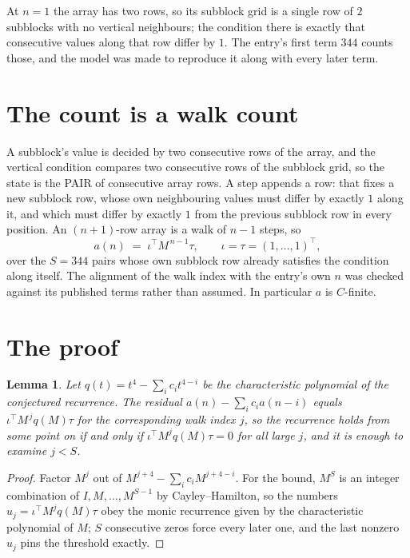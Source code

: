 \documentclass[11pt,a4paper]{article}
\theoremstyle{plain}
\newtheorem{lemma}[theorem]{Lemma}
\theoremstyle{definition}
\begin{document}
At $n=1$ the array has two rows, so its subblock grid is a single row of $2$ subblocks with
no vertical neighbours; the condition there is exactly that consecutive values along that row
differ by $1$. The entry's first term $344$ counts those, and the model was made to
reproduce it along with every later term.

\section{The count is a walk count}

A subblock's value is decided by two consecutive rows of the array, and the
vertical condition compares two consecutive rows of the subblock grid, so the state is the
PAIR of consecutive array rows. A step appends a row: that fixes a new subblock row, whose own
neighbouring values must differ by exactly $1$ along it, and which must differ by exactly
$1$ from the previous subblock row in every position. An $(n+1)$-row array is a walk of
$n-1$ steps, so
\[
a(n)\;=\;\iota^{\!\top}M^{\,n-1}\tau,\qquad\iota=\tau=(1,\dots,1)^{\!\top},
\]
over the $S=344$ pairs whose own subblock row already satisfies the condition along itself.
The alignment of the walk index with the entry's own $n$ was checked against its published
terms rather than assumed. In particular $a$ is $C$-finite.

\section{The proof}

\begin{lemma}\label{lem:crit}
Let $q(t)=t^{4}-\sum_i c_it^{4-i}$ be the characteristic polynomial of the
conjectured recurrence. The residual $a(n)-\sum_ic_ia(n-i)$ equals
$\iota^{\!\top}M^{\,j}q(M)\tau$ for the corresponding walk index $j$, so the recurrence
holds from some point on if and only if $\iota^{\!\top}M^{j}q(M)\tau=0$ for all large $j$,
and it is enough to examine $j<S$.
\end{lemma}

\begin{proof}
Factor $M^{j}$ out of $M^{j+4}-\sum_ic_iM^{j+4-i}$. For the bound, $M^{S}$
is an integer combination of $I,M,\dots,M^{S-1}$ by Cayley--Hamilton, so the numbers
$u_j=\iota^{\!\top}M^{j}q(M)\tau$ obey the monic recurrence given by the characteristic
polynomial of $M$; $S$ consecutive zeros force every later one, and the last nonzero $u_j$
pins the threshold exactly.
\end{proof}
\end{document}
